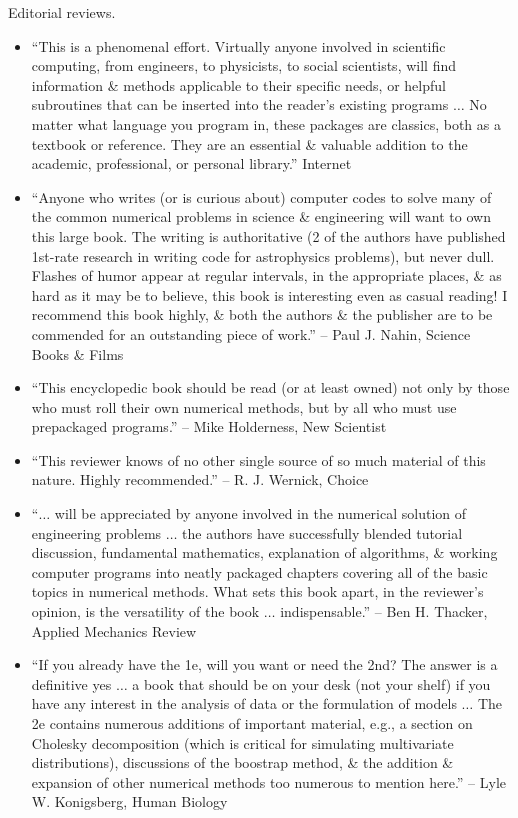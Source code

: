 \documentclass{article}
\begin{document}
\begin{enumerate}
	{\sf Editorial reviews.}
	\begin{itemize}
		\item ``This is a phenomenal effort. Virtually anyone involved in scientific computing, from engineers, to physicists, to social scientists, will find information \& methods applicable to their specific needs, or helpful subroutines that can be inserted into the reader's existing programs $\ldots$ No matter what language you program in, these packages are classics, both as a textbook or reference. They are an essential \& valuable addition to the academic, professional, or personal library.'' Internet
		\item ``Anyone who writes (or is curious about) computer codes to solve many of the common numerical problems in science \& engineering will want to own this large book. The writing is authoritative (2 of the authors have published 1st-rate research in writing code for astrophysics problems), but never dull. Flashes of humor appear at regular intervals, in the appropriate places, \& as hard as it may be to believe, this book is interesting even as casual reading! I recommend this book highly, \& both the authors \& the publisher are to be commended for an outstanding piece of work.'' -- {\sc Paul J. Nahin}, Science Books \& Films
		\item ``This encyclopedic book should be read (or at least owned) not only by those who must roll their own numerical methods, but by all who must use prepackaged programs.'' -- {\sc Mike Holderness}, New Scientist
		\item ``This reviewer knows of no other single source of so much material of this nature. Highly recommended.'' -- {\sc R. J. Wernick}, Choice
		\item ``$\ldots$ will be appreciated by anyone involved in the numerical solution of engineering problems $\ldots$ the authors have successfully blended tutorial discussion, fundamental mathematics, explanation of algorithms, \& working computer programs into neatly packaged chapters covering all of the basic topics in numerical methods. What sets this book apart, in the reviewer's opinion, is the versatility of the book $\ldots$ indispensable.'' -- {\sc Ben H. Thacker}, Applied Mechanics Review
		\item ``If you already have the 1e, will you want or need the 2nd? The answer is a definitive yes $\ldots$ a book that should be on your desk (not your shelf) if you have any interest in the analysis of data or the formulation of models $\ldots$ The 2e contains numerous additions of important material, e.g., a section on Cholesky decomposition (which is critical for simulating multivariate distributions), discussions of the boostrap method, \& the addition \& expansion of other numerical methods too numerous to mention here.'' -- {\sc Lyle W. Konigsberg}, Human Biology

\end{itemize}
\end{enumerate}
\end{document}
